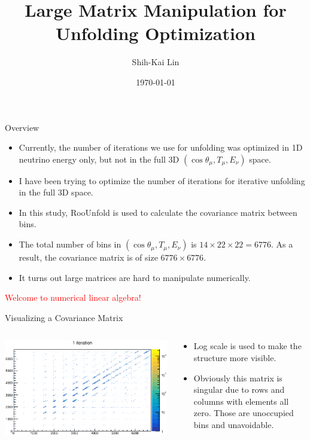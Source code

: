 \documentclass[aspectratio=169]{beamer}
\title{Large Matrix Manipulation for Unfolding Optimization}
\date[today]{\today}
\author{Shih-Kai Lin}
\institute{Colorado State University}
\begin{document}
\begin{frame}
\titlepage
\end{frame}



\begin{frame}{Overview}
  \begin{itemize}
    \item Currently, the number of iterations we use for unfolding was optimized in 1D neutrino energy only, but not in the full 3D $(\cos\theta_\mu,T_\mu,E_\nu)$ space.
    \item I have been trying to optimize the number of iterations for iterative unfolding in the full 3D space.
    \item In this study, RooUnfold is used to calculate the covariance matrix between bins.
    \item The total number of bins in $(\cos\theta_\mu,T_\mu,E_\nu)$ is $14\times 22\times 22=6776$. As a result, the covariance matrix is of size $6776\times 6776$.
    \item It turns out large matrices are hard to manipulate numerically. 
  \end{itemize}
  \bigskip
  \centering
  \textcolor{red}{Welcome to numerical linear algebra!}
\end{frame}

\begin{frame}{Visualizing a Covariance Matrix}
\begin{columns}
  \begin{column}{.6\textwidth}
    \includegraphics[width=\textwidth]{figures/cov_mat.eps}
  \end{column}
  \begin{column}{.4\textwidth}
    \begin{itemize}
      \item Log scale is used to make the structure more visible.
      \item Obviously this matrix is singular due to rows and columns with elements all zero. Those are unoccupied bins and unavoidable.
    \end{itemize}
  \end{column}
\end{columns}
\end{frame}
\end{document}

